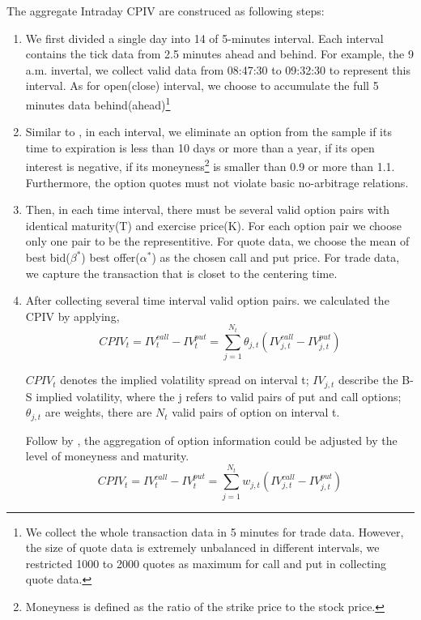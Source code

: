 The aggregate Intraday CPIV are construced as following steps: 
\begin{enumerate}
\item  We first divided a single day into 14 of 5-minutes interval. Each interval contains the tick data from 2.5 minutes ahead and behind. For example, the 9 a.m. invertal, we collect valid data from 08:47:30 to 09:32:30 to represent this interval. As for open(close) interval, we choose to accumulate the full 5 minutes data behind(ahead)\footnote{We collect the whole transaction data in 5 minutes for trade data. However, the size of quote data is extremely unbalanced in different intervals, we restricted 1000 to 2000 quotes as maximum for call and put in collecting quote data.}

\item Similar to \textcite{xing2010does}, in each interval, we eliminate an option from the sample if its time to expiration is less than 10 days or more than a year, if its open interest is negative, if its moneyness\footnote{Moneyness is defined as the ratio of the strike price to the stock price.} is smaller than 0.9 or more than 1.1. Furthermore, the option quotes must not violate basic no-arbitrage relations.

\item Then, in each time interval, there must be several valid option pairs with identical maturity(T) and exercise price(K). For each option pair we choose only one pair to be the representitive. For quote data, we choose the mean of best bid($\beta ^{\ast }$) best offer($\alpha ^{\ast }$) as the chosen call and put price. For trade data, we capture the transaction that is closet to the centering time.  

\item After collecting several time interval valid option pairs. we calculated the CPIV by applying, 
 \begin{equation}
CPIV_{t} = IV_{t}^{call} - IV_{t}^{put} = \sum_{j = 1}^{N_{t}}\theta _{j,t}(IV_{j,t}^{call} - IV_{j,t}^{put})
 \end{equation}
 
$CPIV_{t}$ denotes the implied volatility spread on interval t; $IV_{j,t}$ describe the B-S implied volatility, where the j refers to valid pairs of put and call options; $\theta_{j,t}$ are weights, there are $N_{t}$ valid pairs of option on interval t. 

Follow by \textcite{holowczak2013aggregating}, the aggregation of option information could be adjusted by the level of moneyness and maturity. 
 \begin{equation}
CPIV_{t} = IV_{t}^{call} - IV_{t}^{put} = \sum_{j = 1}^{N_{t}}w_{j,t}(IV_{j,t}^{call} - IV_{j,t}^{put})
 \end{equation}


\end{enumerate}
